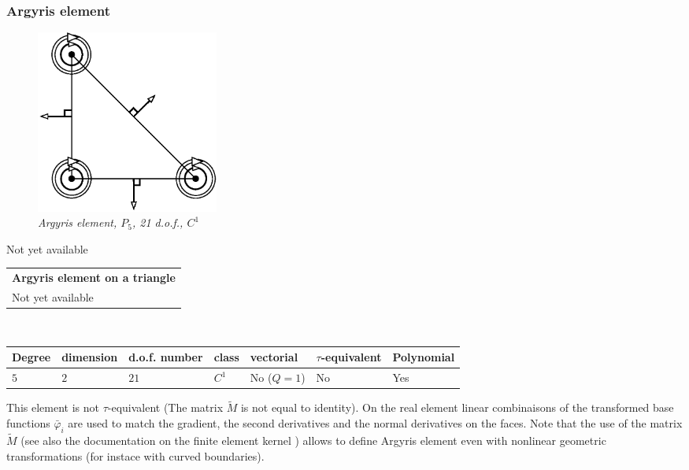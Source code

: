 \documentclass[11pt,a4paper]{article}
\begin{document}
\subsubsection{Argyris element}

\begin{figure}[H]
  \begin{center}
    \includegraphics[width=6cm,angle=0]{getfemlist_argyris.eps}
  \end{center}
  \caption{ \it Argyris element, $P_5$, 21 d.o.f., $C^1$}
  \label{fig:argyris}
\end{figure}
Not yet available

\begin{center}
\begin{tabular}{|m{16.11cm}|} \hline 
{ \bf Argyris element on a triangle}\\
Not yet available
\end{tabular} \\ \vspace{-1pt} 
\begin{tabular}{|m{2cm}|m{2cm}|m{2.5cm}|m{1.2cm}|m{2cm}|m{2cm}|m{1.8cm}|} \hline 
Degree & dimension & d.o.f. number & class & vectorial & \mbox{$\tau$-equivalent} & Polynomial\\ \hline
$5$ & $2$ & $21$ & $C^1$ & No \mbox{($Q = 1$)} & No & Yes\\ \hline
\end{tabular}
\end{center}

This element is not \mbox{$\tau$-equivalent} (The matrix $\tilde{M}$ is not equal to identity). On the real element linear combinaisons of the transformed base functions $\bar{\varphi}_i$ are used to match the gradient, the second derivatives and the normal derivatives on the faces. Note that the use of the matrix  $\tilde{M}$ (see also the documentation on the finite element kernel \cite{BAS_COMP}) allows to define Argyris element even with nonlinear geometric transformations (for instace with curved boundaries).
\end{document}
